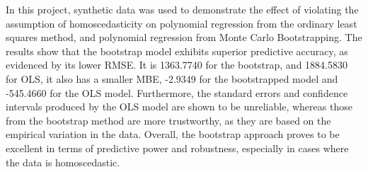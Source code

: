 In this project, synthetic data was used to demonstrate the effect of violating the assumption of homoscedasticity on polynomial regression from the ordinary least squares method, and polynomial regression from Monte Carlo Bootstrapping. The results show that the bootstrap model exhibits superior predictive accuracy, as evidenced by its lower RMSE. It is 1363.7740 for the bootstrap, and 1884.5830 for OLS, it also has a smaller MBE, -2.9349 for the bootstrapped model and -545.4660 for the OLS model. Furthermore, the standard errors and confidence intervals produced by the OLS model are shown to be unreliable, whereas those from the bootstrap method are more trustworthy, as they are based on the empirical variation in the data. Overall, the bootstrap approach proves to be excellent in terms of predictive power and robustness, especially in cases where the data is homoscedastic.